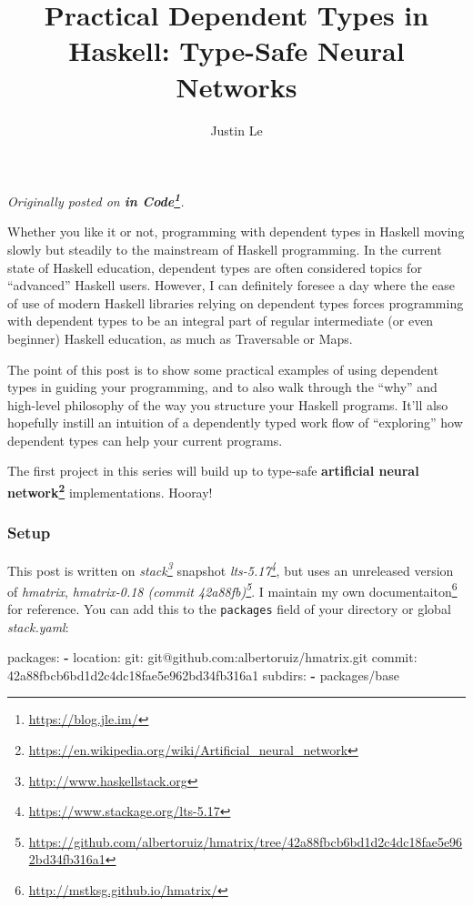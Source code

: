 \documentclass[]{article}
\title{Practical Dependent Types in Haskell: Type-Safe Neural Networks}
\author{Justin Le}
\newenvironment{Shaded}{}{}
\newcommand{\KeywordTok}[1]{\textcolor[rgb]{0.00,0.44,0.13}{\textbf{{#1}}}}
\newcommand{\FunctionTok}[1]{\textcolor[rgb]{0.02,0.16,0.49}{{#1}}}
\newcommand{\NormalTok}[1]{{#1}}
\renewcommand{\href}[2]{#2\footnote{\url{#1}}}
\begin{document}
\maketitle

\emph{Originally posted on \textbf{\href{https://blog.jle.im/}{in
Code}}.}

Whether you like it or not, programming with dependent types in Haskell
moving slowly but steadily to the mainstream of Haskell programming. In
the current state of Haskell education, dependent types are often
considered topics for ``advanced'' Haskell users. However, I can
definitely foresee a day where the ease of use of modern Haskell
libraries relying on dependent types forces programming with dependent
types to be an integral part of regular intermediate (or even beginner)
Haskell education, as much as Traversable or Maps.

The point of this post is to show some practical examples of using
dependent types in guiding your programming, and to also walk through
the ``why'' and high-level philosophy of the way you structure your
Haskell programs. It'll also hopefully instill an intuition of a
dependently typed work flow of ``exploring'' how dependent types can
help your current programs.

The first project in this series will build up to type-safe
\textbf{\href{https://en.wikipedia.org/wiki/Artificial_neural_network}{artificial
neural network}} implementations. Hooray!

\subsubsection{Setup}\label{setup}

This post is written on \emph{\href{http://www.haskellstack.org}{stack}}
snapshot \emph{\href{https://www.stackage.org/lts-5.17}{lts-5.17}}, but
uses an unreleased version of \emph{hmatrix},
\emph{\href{https://github.com/albertoruiz/hmatrix/tree/42a88fbcb6bd1d2c4dc18fae5e962bd34fb316a1}{hmatrix-0.18
(commit 42a88fb)}}. I \href{http://mstksg.github.io/hmatrix/}{maintain
my own documentaiton} for reference. You can add this to the
\texttt{packages} field of your directory or global \emph{stack.yaml}:

\begin{Shaded}
\begin{Highlighting}[]
\FunctionTok{packages:}
\KeywordTok{-} \FunctionTok{location:}
    \FunctionTok{git:} \NormalTok{git@github.com:albertoruiz/hmatrix.git}
    \FunctionTok{commit:} \NormalTok{42a88fbcb6bd1d2c4dc18fae5e962bd34fb316a1}
  \FunctionTok{subdirs:}
    \KeywordTok{-} \NormalTok{packages/base}
\end{Highlighting}
\end{Shaded}
\end{document}
